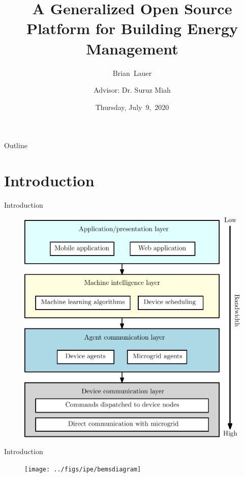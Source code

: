 \documentclass{beamer}
\title[Progress Update]{A Generalized Open Source Platform for Building Energy Management}
\author[B.~Lauer]{Brian~Lauer\\\and
Advisor: Dr. Suruz Miah}
\institute[Bradley University] %
{
  Department of Electrical and Computer Engineering\\
  Bradley University\\
  1501 W. Bradley Avenue\\
  Peoria, IL, 61625, USA
}
\date[July~9,~2020]{Thursday, July~9,~2020}
\begin{document}
\begin{frame}
  \titlepage
\end{frame}

\begin{frame}{Outline}
  \tableofcontents
\end{frame}
\section{Introduction}

\begin{frame}{Introduction}{}
  \begin{figure}
  \includegraphics[scale=0.35]{../figs/ipe/BEMS-softwareArchitecture}
  \end{figure}
\end{frame}

\begin{frame}{Introduction}{}
  \begin{figure}
  \texttt{[image: ../figs/ipe/bemsdiagram]}
  \end{figure}
\end{frame}
\end{document}
